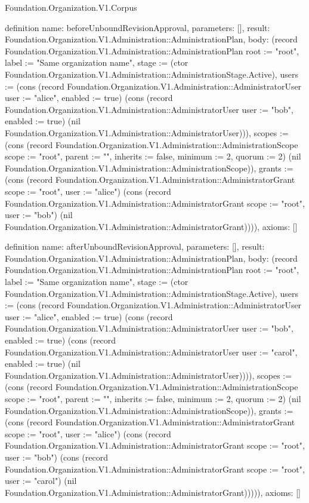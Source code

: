 \begin{lexlean}{Foundation.Organization.V1.Corpus}
\begin{semanticmodule}
definition{
  name: beforeUnboundRevisionApproval,
  parameters: [],
  result: Foundation.Organization.V1.Administration::AdministrationPlan,
  body: (record Foundation.Organization.V1.Administration::AdministrationPlan {root := "root", label := "Same organization name", stage := (ctor Foundation.Organization.V1.Administration::AdministrationStage.Active), users := (cons (record Foundation.Organization.V1.Administration::AdministratorUser {user := "alice", enabled := true}) (cons (record Foundation.Organization.V1.Administration::AdministratorUser {user := "bob", enabled := true}) (nil Foundation.Organization.V1.Administration::AdministratorUser))), scopes := (cons (record Foundation.Organization.V1.Administration::AdministrationScope {scope := "root", parent := "", inherits := false, minimum := 2, quorum := 2}) (nil Foundation.Organization.V1.Administration::AdministrationScope)), grants := (cons (record Foundation.Organization.V1.Administration::AdministratorGrant {scope := "root", user := "alice"}) (cons (record Foundation.Organization.V1.Administration::AdministratorGrant {scope := "root", user := "bob"}) (nil Foundation.Organization.V1.Administration::AdministratorGrant)))}),
  axioms: []
}

definition{
  name: afterUnboundRevisionApproval,
  parameters: [],
  result: Foundation.Organization.V1.Administration::AdministrationPlan,
  body: (record Foundation.Organization.V1.Administration::AdministrationPlan {root := "root", label := "Same organization name", stage := (ctor Foundation.Organization.V1.Administration::AdministrationStage.Active), users := (cons (record Foundation.Organization.V1.Administration::AdministratorUser {user := "alice", enabled := true}) (cons (record Foundation.Organization.V1.Administration::AdministratorUser {user := "bob", enabled := true}) (cons (record Foundation.Organization.V1.Administration::AdministratorUser {user := "carol", enabled := true}) (nil Foundation.Organization.V1.Administration::AdministratorUser)))), scopes := (cons (record Foundation.Organization.V1.Administration::AdministrationScope {scope := "root", parent := "", inherits := false, minimum := 2, quorum := 2}) (nil Foundation.Organization.V1.Administration::AdministrationScope)), grants := (cons (record Foundation.Organization.V1.Administration::AdministratorGrant {scope := "root", user := "alice"}) (cons (record Foundation.Organization.V1.Administration::AdministratorGrant {scope := "root", user := "bob"}) (cons (record Foundation.Organization.V1.Administration::AdministratorGrant {scope := "root", user := "carol"}) (nil Foundation.Organization.V1.Administration::AdministratorGrant))))}),
  axioms: []
}


\end{semanticmodule}
\end{lexlean}
